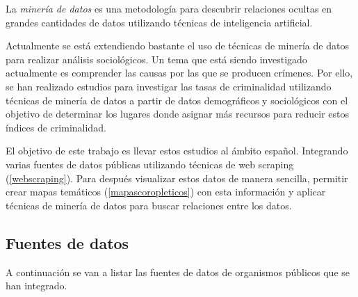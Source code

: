 
La \textit{minería de datos} es una metodología para descubrir relaciones ocultas en grandes cantidades de datos utilizando técnicas de inteligencia artificial.

Actualmente se está extendiendo bastante el uso de técnicas de minería de datos para realizar análisis sociológicos. Un tema que está siendo investigado actualmente es comprender las causas por las que se producen crímenes. Por ello, se han realizado estudios para investigar las tasas de criminalidad utilizando técnicas de minería de datos \cite{art:crimeprediction} \cite{art:crimeprediction2} a partir de datos demográficos y sociológicos con el objetivo de determinar los lugares donde asignar más recursos para reducir estos índices de criminalidad.

El objetivo de este trabajo es llevar estos estudios al ámbito español. Integrando varias fuentes de datos públicas utilizando técnicas de web scraping (\ref{webscraping}). Para  después visualizar estos datos de manera sencilla, permitir crear mapas temáticos (\ref{mapascoropleticos}) con esta información y aplicar técnicas de minería de datos para buscar relaciones entre los datos.

\subsection{Fuentes de datos}

A continuación se van a listar las fuentes de datos de organismos públicos que se han integrado.

